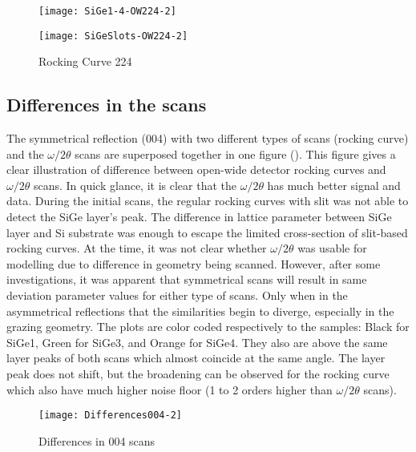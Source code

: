 \begin{figure}%
\caption{Rocking Curve 224}
\label{OW224}
\begin{minipage}{0.85\linewidth}
\texttt{[image: SiGe1-4-OW224-2]}
\end{minipage}
\begin{minipage}{0.85\linewidth}
\texttt{[image: SiGeSlots-OW224-2]}
\end{minipage}
\end{figure}



\subsection{Differences in the scans}

The symmetrical reflection (004) with two different types of scans (rocking curve) and the $\omega/2\theta$ scans are superposed together in one figure ().  This figure gives a clear illustration of difference between open-wide detector rocking curves and $\omega/2\theta$ scans.  In quick glance, it is clear that the $\omega/2\theta$ has much better signal and data.  During the initial scans, the regular rocking curves with slit was not able to detect the SiGe layer's peak.  The difference in lattice parameter between SiGe layer and Si substrate was enough to escape the limited cross-section of slit-based rocking curves.  At the time, it was not clear whether  $\omega/2\theta$ was usable for modelling due to difference in geometry being scanned.  However, after some investigations, it was apparent that symmetrical scans will result in same deviation parameter values for either type of scans.  Only when in the asymmetrical reflections that the similarities begin to diverge, especially in the grazing geometry.  The plots are color coded respectively to the samples:  Black for SiGe1, Green for SiGe3, and Orange for SiGe4.  They also are above the same layer peaks of both scans which almost coincide at the same angle.  The layer peak does not shift, but the broadening can be observed for the rocking curve which also have much higher noise floor (1 to 2 orders higher than $\omega/2\theta$ scans).

\begin{figure}%
\caption{Differences in 004 scans}
\label{Diff004}
\begin{minipage}{0.85\linewidth}
\texttt{[image: Differences004-2]}
\end{minipage}
\end{figure}

